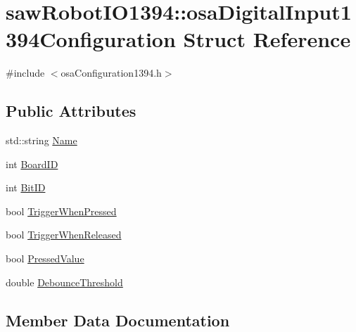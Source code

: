 \hypertarget{structsaw_robot_i_o1394_1_1osa_digital_input1394_configuration}{}\section{saw\+Robot\+I\+O1394\+:\+:osa\+Digital\+Input1394\+Configuration Struct Reference}
\label{structsaw_robot_i_o1394_1_1osa_digital_input1394_configuration}


{\ttfamily \#include $<$osa\+Configuration1394.\+h$>$}

\subsection*{Public Attributes}
\begin{DoxyCompactItemize}
\item 
std\+::string \hyperlink{structsaw_robot_i_o1394_1_1osa_digital_input1394_configuration_aaddb057ed9582c51edfc373d1d58edaa}{Name}
\item 
int \hyperlink{structsaw_robot_i_o1394_1_1osa_digital_input1394_configuration_a30b36233cc06e03d251f90131dd953fd}{Board\+I\+D}
\item 
int \hyperlink{structsaw_robot_i_o1394_1_1osa_digital_input1394_configuration_a92c84800ba56b8a03122b938713fc2dc}{Bit\+I\+D}
\item 
bool \hyperlink{structsaw_robot_i_o1394_1_1osa_digital_input1394_configuration_aa4c2fb5015bf09a92f11d3e80580951b}{Trigger\+When\+Pressed}
\item 
bool \hyperlink{structsaw_robot_i_o1394_1_1osa_digital_input1394_configuration_a8422056c0ee6a2e53ecced0d79efe1b8}{Trigger\+When\+Released}
\item 
bool \hyperlink{structsaw_robot_i_o1394_1_1osa_digital_input1394_configuration_a61f1b148dcece33e512f16d9f2865f56}{Pressed\+Value}
\item 
double \hyperlink{structsaw_robot_i_o1394_1_1osa_digital_input1394_configuration_afbdaea0a87c9658a0bb4ab161e3e87a3}{Debounce\+Threshold}
\end{DoxyCompactItemize}


\subsection{Member Data Documentation}
\hypertarget{structsaw_robot_i_o1394_1_1osa_digital_input1394_configuration_a92c84800ba56b8a03122b938713fc2dc}{}

